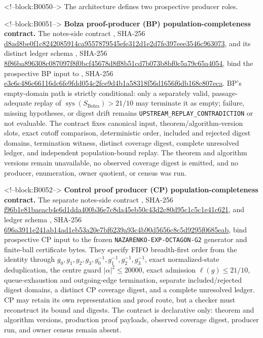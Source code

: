 \documentclass[11pt,a4paper]{article}
\begin{document}
<!--block:B0050-->
The architecture defines two prospective producer roles.

<!--block:B0051-->
\textbf{Bolza proof-producer (BP) population-completeness contract.} The notes-side contract , SHA-256 \url{d8ad8be0f1c8242085914ca9557879545efe312d1e2d7fe397eee3546c963073}, and its distinct ledger schema , SHA-256 \url{8f86ba896308c087097f8f0bcf45678d8ff8b51cd7b073b8bf0c5a79c65a4054}, bind the prospective BP input to , SHA-256 \url{e3e6c486c66116dc6fe9fdd054c2fce9d4b1a58318f56d1656f6db168c807eca}. BP's empty-domain path is strictly conditional: only a separately valid, passage-adequate replay of \(\operatorname{sys}(S_{\mathrm{Bolza}})>21/10\) may terminate it as empty; failure, missing hypotheses, or digest drift remains \texttt{UPSTREAM\_REPLAY\_CONTRADICTION} or not evaluable. The contract fixes canonical input, theorem/algorithm-version slots, exact cutoff comparison, deterministic order, included and rejected digest domains, termination witness, distinct coverage digest, complete unresolved ledger, and independent population-bound replay. The theorem and algorithm versions remain unavailable, no observed coverage digest is emitted, and no producer, enumeration, owner quotient, or census was run.

<!--block:B0052-->
\textbf{Control proof producer (CP) population-completeness contract.} The separate notes-side contract , SHA-256 \url{f96b1e81baeacb4e6d1dda400b36e7c8da45eb50c43d2c80d95c1c5c1e41c621}, and ledger schema , SHA-256 \url{696a3911e241ab14ad1eb53a20e7bf6239a93c4b90d5656c8c5d9295f0685eab}, bind prospective CP input to the frozen \texttt{NAZARENKO-EXP-OCTAGON-G2} generator and finite-ball certificate bytes. They specify FIFO breadth-first order from the identity through \(g_0,g_1,g_2,g_3,g_0^{-1},g_1^{-1},g_2^{-1},g_3^{-1}\), exact normalized-state deduplication, the centre guard \(\lvert\alpha\rvert^2\leq20000\), exact admission \(\ell(g)\leq21/10\), queue-exhaustion and outgoing-edge termination, separate included/rejected digest domains, a distinct CP coverage digest, and a complete unresolved ledger. CP may retain its own representation and proof route, but a checker must reconstruct its bound and digests. The contract is declarative only: theorem and algorithm versions, production proof payloads, observed coverage digest, producer run, and owner census remain absent.
\end{document}
